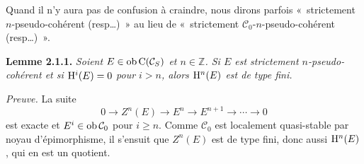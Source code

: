 \documentclass[11pt]{article}
\begin{document}
Quand il n'y aura pas de confusion à craindre, nous dirons parfois «~strictement \(n\)-pseudo-cohérent (resp\dots)~» au lieu de «~strictement \(\mathcal C_0\)-\(n\)-pseudo-cohérent (resp\dots)~».

\textbf{Lemme 2.1.1.} \emph{Soient \(E\in\operatorname{ob}\mathrm C(\mathcal C_S)\) et \(n\in\mathbb Z\). Si \(E\) est strictement \(n\)-pseudo-cohérent et si \(\mathrm H^i(E)=0\) pour \(i>n\), alors \(\mathrm H^n(E)\) est de type fini.}

\emph{Preuve.} La suite
\[
  0\longrightarrow Z^n(E)\longrightarrow E^n\longrightarrow E^{n+1}\longrightarrow\cdots\longrightarrow 0
\]
est exacte et \(E^i\in\operatorname{ob}\mathcal C_0\) pour \(i\geq n\). Comme \(\mathcal C_0\) est localement quasi-stable par noyau d'épimorphisme, il s'ensuit que \(Z^n(E)\) est de type fini, donc aussi \(\mathrm H^n(E)\), qui en est un quotient.
\end{document}
